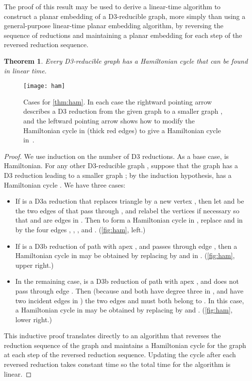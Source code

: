 \documentclass{article}
\newtheorem{theorem}{Theorem}
\begin{document}
The proof of this result may be used to derive a linear-time algorithm to construct a planar embedding of a D3-reducible graph, more simply than using a general-purpose linear-time planar embedding algorithm, by reversing the sequence of reductions and maintaining a planar embedding for each step of the reversed reduction sequence.

\begin{theorem}
\label{thm:ham}
Every D3-reducible graph has a Hamiltonian cycle that can be found in linear time.
\end{theorem}

\begin{figure}[t]
\centering
\texttt{[image: ham]}
\caption{Cases for \autoref{thm:ham}. In each case the rightward pointing arrow describes a D3 reduction from the given graph  to a smaller graph , and the leftward pointing arrow shows how to modify the Hamiltonian cycle  in  (thick red edges) to give a Hamiltonian cycle in~.}
\label{fig:ham}
\end{figure}

\begin{proof}
We use induction on the number of D3 reductions.
As a base case,  is Hamiltonian. For any other D3-reducible graph , suppose that the graph has a D3 reduction  leading to a smaller graph ; by the induction hypothesis,  has a Hamiltonian cycle . We have three cases:
\begin{itemize}
\item If  is a D3a reduction that replaces triangle  by a new vertex , then let  and  be the two edges of  that pass through , and relabel the vertices if necessary so that  and  are edges in . Then to form a Hamiltonian cycle in , replace  and  in  by the four edges , , , and . (\autoref{fig:ham}, left.)
\item If  is a D3b reduction of path  with apex , and  passes through edge ,
then a Hamiltonian cycle in  may be obtained by replacing  by  and  in . (\autoref{fig:ham}, upper right.)
\item In the remaining case,  is a D3b reduction of path  with apex , and  does not pass through edge . Then (because  and  both have degree three in , and have two incident edges in ) the two edges  and  must both belong to .
In this case, a Hamiltonian cycle  in  may be obtained by replacing  by
 and . (\autoref{fig:ham}, lower right.)
\end{itemize}
This inductive proof translates directly to an algorithm that reverses the reduction sequence of the  graph and maintains a Hamiltonian cycle for the graph at each step of the reversed reduction sequence. Updating the cycle after each reversed reduction takes constant time so the total time for the algorithm is linear.
\end{proof}
\end{document}
